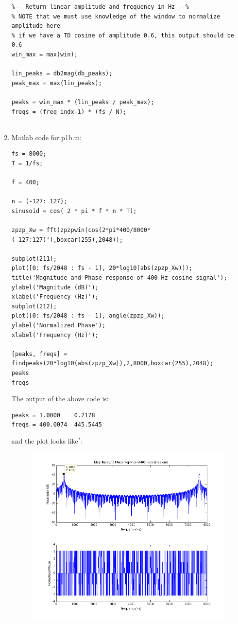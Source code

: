 \documentclass[11pt]{article}
\begin{document}
\begin{enumerate}
\begin{verbatim}
%-- Return linear amplitude and frequency in Hz --%
% NOTE that we must use knowledge of the window to normalize amplitude here
% if we have a TD cosine of amplitude 0.6, this output should be 0.6
win_max = max(win);

lin_peaks = db2mag(db_peaks);
peak_max = max(lin_peaks);

peaks = win_max * (lin_peaks / peak_max);
freqs = (freq_indx-1) * (fs / N);


\end{verbatim}

\item Matlab code for p1b.m:
\begin{verbatim}
fs = 8000;
T = 1/fs;

f = 400;

n = (-127: 127);
sinusoid = cos( 2 * pi * f * n * T);

zpzp_Xw = fft(zpzpwin(cos(2*pi*400/8000*(-127:127)'),boxcar(255),2048));

subplot(211);
plot([0: fs/2048 : fs - 1], 20*log10(abs(zpzp_Xw)));
title('Magnitude and Phase response of 400 Hz cosine signal');
ylabel('Magnitude (dB)');
xlabel('Frequency (Hz)');
subplot(212);
plot([0: fs/2048 : fs - 1], angle(zpzp_Xw));
ylabel('Normalized Phase');
xlabel('Frequency (Hz)');

[peaks, freqs] = findpeaks(20*log10(abs(zpzp_Xw)),2,8000,boxcar(255),2048);
peaks
freqs
\end{verbatim}
The output of the above code is:
\begin{verbatim}
peaks = 1.0000    0.2178
freqs = 400.0074  445.5445
\end{verbatim}
and the plot looks like$^*$:

\begin{figure}[!h]
\includegraphics[scale=.7]{p1b}
\end{figure}


\end{enumerate}
\end{document}
